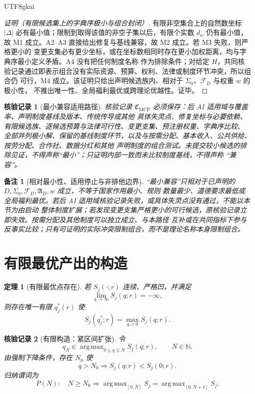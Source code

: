 \documentclass[12pt,a4paper,openany]{report}
\newtheorem{theorem}{定理}[chapter]
\newtheorem{remark}{备注}[chapter]
\newtheorem{Certificate}{核验记录}[chapter]
\newcommand{\NN}{\mathbb N}
\newcommand{\Abs}[1]{\left\lvert #1\right\rvert}
\DeclareMathOperator*{\argmax}{arg\,max}
\begin{document}
\begin{CJK*}{UTF8}{gkai}
\begin{proof}[证明（有限候选集上的字典序极小与组合封闭）]
有限非空集合上的自然数坐标 \(\Abs{\Delta}\) 必有最小值；限制到取得该值的非空子集以后，有限个实数
\(d_w\) 仍有最小值，故 M1 成立。A2--A3 直接给出修复与基线兼容，故 M2 成立。若 M3 失败，则严格更小的
变更支集必有更少坐标，或在坐标数相同时存在更小加权距离，均与字典序最小定义矛盾。A4 没有把任何制度名称
作为排除条件；对给定 \(H\)，共同核验记录通过即表示组合没有实际资源、预算、权利、法律或制度环节冲突，所以组合仍
可行，M4 成立。该证明只给出声明候选族内、相对于 \(\Sigma_0\)、\(\mathcal F_D\) 与权重 \(w\) 的极小性，
不推出唯一性、全局福利最优或跨理论优越性。证毕。
\end{proof}

\begin{Certificate}[最小兼容适用路径]
\label{cert:minimal-compatible-path}
核验记录 \(\mathfrak C_{\mathrm{MCP}}\) 必须保存：后 AI 适用域与覆盖率、声明制度基线及版本、传统传导或其他
具体失灵点、修复坐标与必要依赖、有限候选族、逐候选预算与法律可行性、变更支集、预注册权重、字典序比较、
全部并列极小解、保留的基线制度环节，以及与按需分配、基本收入、公共供给、按劳分配、合作社、数据分红和其他
声明制度的组合测试。未提交较小候选的排除见证，不得声称“最小”；只证明内部一致而未比较制度基线，不得声称
“兼容”。
\end{Certificate}

\begin{remark}[相对最小性、适用停止与非排他边界]
“最小兼容”只相对于已声明的 \(D,\Sigma_0,\mathcal F_D,\mathfrak A_D,w\) 成立，不等于国家作用最小、规则
数量最少、道德要求最低或全局福利最优。若后 AI 适用域核验记录失败，或具体失灵点没有通过，不能以本节为由启动
整体制度扩展；若发现变更支集严格更小的可行候选，原核验记录立即失效。按需分配及其他制度可以独立成立、与本路径
互补或在共同指标下参与反事实比较；只有可证明的实际冲突限制组合，而不是理论名称本身限制组合。
\end{remark}

\section{有限最优产出的构造}

\begin{theorem}[有限最优点存在]
\label{thm:finite-unconstrained-optimum}
若 \(S_j(\cdot;r)\) 连续、严格凹，并满足
\[
  \lim_{q\to\infty}S_j(q;r)=-\infty,
\]
则存在唯一有限 \(q_j^*(r)\) 使
\[
  S_j(q_j^*;r)=\max_{q\ge0}S_j(q;r).
\]
\end{theorem}

\begin{Certificate}[有限构造：紧区间扩张]
\label{cert:finite-unconstrained-optimum}
令
\[
  q_N\in\argmax_{0\le q\le N}S_j(q;r),\qquad N\in\NN.
\]
由强制下降条件，存在 \(N_0\) 使
\[
  q>N_0\Longrightarrow S_j(q;r)<S_j(0;r).
\]
归纳谓词为
\[
  P(N):\quad N\ge N_0\Longrightarrow
  \argmax_{[0,N]}S_j=\argmax_{[0,N+1]}S_j.
\]
\end{Certificate}


\end{CJK*}
\end{document}
